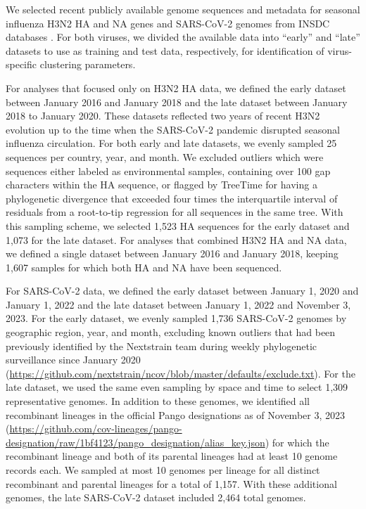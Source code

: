 \documentclass[webpdf,contemporary,large,single]{oup-authoring-template}%
\theoremstyle{thmstyleone}%
\theoremstyle{thmstyletwo}%
\theoremstyle{thmstylethree}%
\begin{document}
We selected recent publicly available genome sequences and metadata for seasonal influenza H3N2 HA and NA genes and SARS-CoV-2 genomes from INSDC databases \citep{Arita2021}.
For both viruses, we divided the available data into ``early'' and ``late'' datasets to use as training and test data, respectively, for identification of virus-specific clustering parameters.

For analyses that focused only on H3N2 HA data, we defined the early dataset between January 2016 and January 2018 and the late dataset between January 2018 to January 2020.
These datasets reflected two years of recent H3N2 evolution up to the time when the SARS-CoV-2 pandemic disrupted seasonal influenza circulation.
For both early and late datasets, we evenly sampled 25 sequences per country, year, and month.
We excluded outliers which were sequences either labeled as environmental samples, containing over 100 gap characters within the HA sequence, or flagged by TreeTime \citep{Sagulenko2018} for having a phylogenetic divergence that exceeded four times the interquartile interval of residuals from a root-to-tip regression for all sequences in the same tree.
With this sampling scheme, we selected 1,523 HA sequences for the early dataset and 1,073 for the late dataset.
For analyses that combined H3N2 HA and NA data, we defined a single dataset between January 2016 and January 2018, keeping 1,607 samples for which both HA and NA have been sequenced.

For SARS-CoV-2 data, we defined the early dataset between January 1, 2020 and January 1, 2022 and the late dataset between January 1, 2022 and November 3, 2023.
For the early dataset, we evenly sampled 1,736 SARS-CoV-2 genomes by geographic region, year, and month, excluding known outliers that had been previously identified by the Nextstrain team during weekly phylogenetic surveillance since January 2020 (\url{https://github.com/nextstrain/ncov/blob/master/defaults/exclude.txt}).
For the late dataset, we used the same even sampling by space and time to select 1,309 representative genomes.
In addition to these genomes, we identified all recombinant lineages in the official Pango designations as of November 3, 2023 (\url{https://github.com/cov-lineages/pango-designation/raw/1bf4123/pango_designation/alias_key.json}) for which the recombinant lineage and both of its parental lineages had at least 10 genome records each.
We sampled at most 10 genomes per lineage for all distinct recombinant and parental lineages for a total of 1,157.
With these additional genomes, the late SARS-CoV-2 dataset included 2,464 total genomes.
\end{document}
